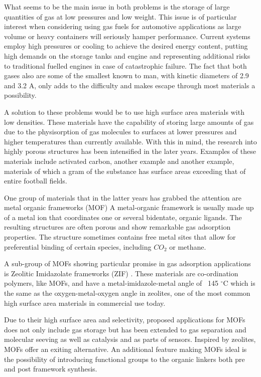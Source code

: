 What seems to be the main issue in both problems is the storage of large quantities of gas at low pressures and low weight. This issue is of particular interest when considering using gas fuels for automotive applications as large volume or heavy containers will seriously hamper performance. Current systems employ high pressures or cooling to achieve the desired energy content, putting high demands on the storage tanks and engine and representing additional risks to traditional fuelled engines in case of catastrophic failure. The fact that both gases also are some of the smallest known to man, with kinetic diameters of 2.9 and 3.2 A, only adds to the difficulty and makes escape through most materials a possibility. 

A solution to these problems would be to use high surface area materials with low densities. These materials have the capability of storing large amounts of gas due to the physisorption of gas molecules to surfaces at lower pressures and higher temperatures than currently available. With this in mind, the research into highly porous structures has been intensified in the later years. Examples of these materials include activated carbon, another example and another example, materials of which a gram of the substance has surface areas exceeding that of entire football fields\supercite{Garcia12,VandenBerg08}.

One group of materials that in the latter years has grabbed the attention are metal organic frameworks (MOF) %
A metal-organic framework is usually made up of a metal ion that coordinates one or several bidentate, organic ligands. The resulting structures are often porous and show remarkable gas adsorption properties.\supercite{Cheetham99, Lewis09} The structure sometimes contains free metal sites that allow for preferential binding of certain species, including $CO_2$ or methane\supercite{Morris12}. %

A sub-group of MOFs showing particular promise in gas adsorption applications is Zeolitic Imidazolate frameworks (ZIF) . These materials are co-ordination polymers, like MOFs, and have a metal-imidazole-metal angle of ~145 $^\circ$C which is the same as the oxygen-metal-oxygen angle in zeolites, one of the most common high surface area materials in commercial use today.

Due to their high surface area and selectivity, proposed applications for MOFs does not only include gas storage but has been extended to gas separation and molecular seeving as well as catalysis and as parts of sensors.\supercite{Wang03,Phan10} Inspired by zeolites, MOFs offer an exiting alternative. An additional feature making MOFs ideal is the possibility of introducing functional groups to the organic linkers both pre and post framework synthesis.\supercite{}

